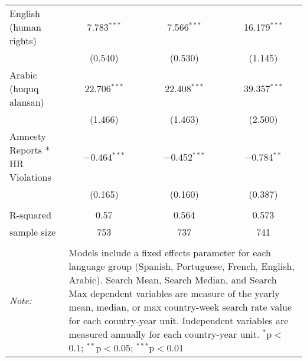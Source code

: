 \begin{table}[!htbp]
\begin{tabular}{@{\extracolsep{5pt}}lccc}
  English (human rights) & 7.783$^{***}$ & 7.566$^{***}$ & 16.179$^{***}$ \\ 
  & (0.540) & (0.530) & (1.145) \\ 
  Arabic (huquq alansan) & 22.706$^{***}$ & 22.408$^{***}$ & 39.357$^{***}$ \\ 
  & (1.466) & (1.463) & (2.500) \\ 
  Amnesty Reports * HR Violations & $-$0.464$^{***}$ & $-$0.452$^{***}$ & $-$0.784$^{**}$ \\ 
  & (0.165) & (0.160) & (0.387) \\ 
 \hline \\[-1.8ex] 
R-squared  & 0.57 & 0.564 & 0.573 \\ 
sample size  & 753 & 737 & 741 \\ 
\hline 
\hline \\[-1.8ex] 
\textit{Note:}  & \multicolumn{3}{l}{\parbox[t]{8cm}{Models include a fixed effects parameter for each language group (Spanish, Portuguese, French, English, Arabic). Search Mean, Search Median, and Search Max dependent variables are measure of the yearly mean, median, or max country-week search rate value for each country-year unit. Independent variables are measured annually for each country-year unit. $^{*}$p$<$0.1; $^{**}$p$<$0.05; $^{***}$p$<$0.01}} \\ 
\end{tabular} 
\end{table} 
